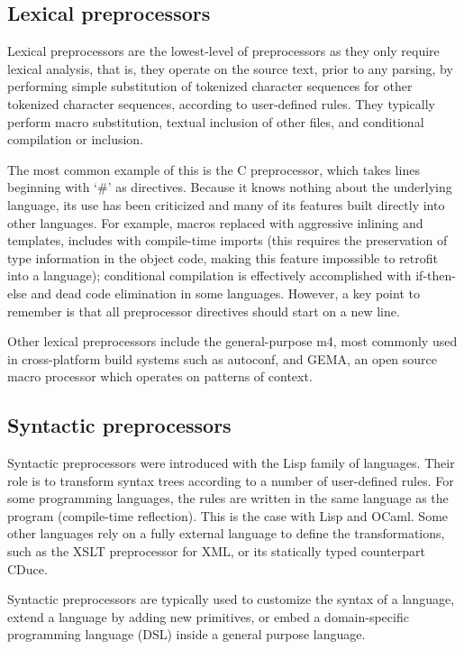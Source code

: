 \documentclass[a4paper]{report}
\begin{document}
\subsection{Lexical preprocessors}
Lexical preprocessors are the lowest-level of preprocessors as they only require lexical analysis, that is, they operate on the source text, prior to any parsing, by performing simple substitution of tokenized character sequences for other tokenized character sequences, according to user-defined rules. They typically perform macro substitution, textual inclusion of other files, and conditional compilation or inclusion. 
\par
The most common example of this is the C preprocessor, which takes lines beginning with `\#' as directives. Because it knows nothing about the underlying language, its use has been criticized and many of its features built directly into other languages. For example, macros replaced with aggressive inlining and templates, includes with compile-time imports (this requires the preservation of type information in the object code, making this feature impossible to retrofit into a language); conditional compilation is effectively accomplished with if-then-else and dead code elimination in some languages. However, a key point to remember is that all preprocessor directives should start on a new line. 
\par
Other lexical preprocessors include the general-purpose m4, most commonly used in cross-platform build systems such as autoconf, and GEMA, an open source macro processor which operates on patterns of context. 

\subsection{Syntactic preprocessors}
Syntactic preprocessors were introduced with the Lisp family of languages. Their role is to transform syntax trees according to a number of user-defined rules. For some programming languages, the rules are written in the same language as the program (compile-time reflection). This is the case with Lisp and OCaml. Some other languages rely on a fully external language to define the transformations, such as the XSLT preprocessor for XML, or its statically typed counterpart CDuce.
\par
Syntactic preprocessors are typically used to customize the syntax of a language, extend a language by adding new primitives, or embed a domain-specific programming language (DSL) inside a general purpose language. 
\end{document}
